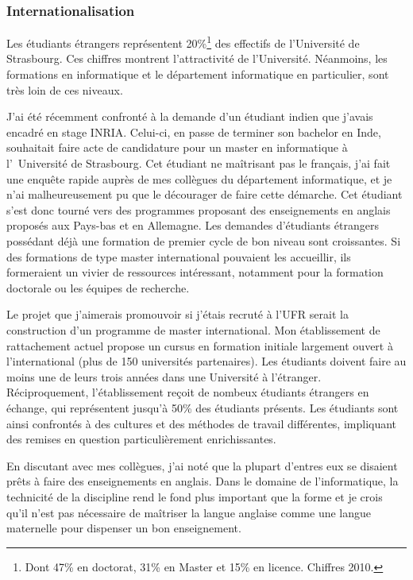 \documentclass[11pt]{article}
\begin{document}
\subsubsection{Internationalisation}

Les étudiants étrangers représentent 20\%\footnote{Dont 47\% en doctorat, 31\% 
en Master et 15\% en licence. Chiffres 2010.} des effectifs de l'Université de 
Strasbourg. Ces chiffres montrent l'attractivité de l'Université.  Néanmoins, 
les formations en informatique et le département informatique en particulier, 
sont très loin de ces niveaux.

J'ai été récemment confronté à la demande d'un étudiant indien que j'avais 
encadré en stage INRIA. Celui-ci, en passe de terminer son bachelor en Inde, 
souhaitait faire acte de candidature pour un master en informatique à \hbox{l'
Université} de Strasbourg. Cet étudiant ne maîtrisant pas le français, j'ai fait 
une enquête rapide auprès de mes collègues du département informatique, et je 
n'ai malheureusement pu que le décourager de faire cette démarche. Cet étudiant 
s'est donc tourné vers des programmes proposant des enseignements en anglais 
proposés aux Pays-bas et en Allemagne. Les demandes d'étudiants étrangers 
possédant déjà une formation de premier cycle de bon niveau sont croissantes. 
Si des formations de type master international pouvaient les accueillir, ils 
formeraient un vivier de ressources intéressant, notamment pour la formation 
doctorale ou les équipes de recherche. 

Le projet que j'aimerais promouvoir si j'étais recruté à l'UFR serait la 
construction d'un programme de master international. Mon établissement de 
rattachement actuel propose un cursus en formation initiale largement ouvert 
à l'international (plus de 150 universités partenaires). Les étudiants doivent 
faire au moins une de leurs trois années dans une Université à l'étranger.
Réciproquement, l'établissement reçoit de nombeux étudiants étrangers en échange, 
qui représentent jusqu'à 50\% des étudiants présents. Les étudiants sont ainsi 
confrontés à des cultures et des méthodes de travail différentes, impliquant 
des remises en question particulièrement enrichissantes.

En discutant avec mes collègues, j'ai noté que la plupart d'entres eux 
se disaient prêts à faire des enseignements en anglais. Dans le domaine de 
l'informatique, la technicité de la discipline rend le fond plus important que 
la forme et je crois qu'il n'est pas nécessaire de maîtriser la langue anglaise 
comme une langue maternelle pour dispenser un bon enseignement.
\end{document}
